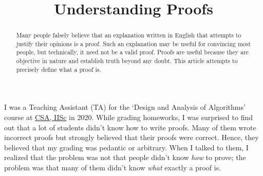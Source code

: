 
\usepackage[shortlabels]{enumitem}
\usepackage{setspace}

\onehalfspacing

\DeclareMathOperator{\isOdd}{isOdd}
\newcommand*{\todotext}[1]{\textcolor{red}{#1}}
\newenvironment*{tightemize}{\begin{itemize}[noitemsep,topsep=0pt]}{\end{itemize}}

\renewcommand{\algorithmiccomment}[1]{\hfill\textcolor{gray}{\texttt{//} \textit{#1}}}
\newsavebox{\formalproofbox}
\newenvironment*{formalproof}%
{\begin{lrbox}{\formalproofbox}\begin{minipage}{0.9\textwidth}\phantomsection\algorithmic[1]}%
{\endalgorithmic\end{minipage}\end{lrbox}\vspace{\parskip}\noindent
\colorbox[HTML]{EEEEEE}{\usebox{\formalproofbox}}\vspace{\parskip}}

\title{Understanding Proofs}



\maketitle
\setlength{\parskip}{0.4em}

\begin{abstract}
Many people falsely believe that an explanation written in English
that attempts to justify their opinions is a proof.
Such an explanation may be useful for convincing most people,
but technically, it need not be a valid proof.
Proofs are useful because they are objective in nature
and establish truth beyond any doubt.
This article attempts to precisely define what a proof is.
\end{abstract}

I was a Teaching Assistant (TA) for the `Design and Analysis of Algorithms' course
at \href{https://www.csa.iisc.ac.in/}{CSA, IISc} in 2020.
While grading homeworks, I was surprised to find out that
a lot of students didn't know how to write proofs.
Many of them wrote incorrect proofs but strongly believed that their proofs were correct.
Hence, they believed that my grading was pedantic or arbitrary.
When I talked to them, I realized that the problem was
not that people didn't know \emph{how} to prove;
the problem was that many of them didn't know \emph{what} exactly a proof is.

